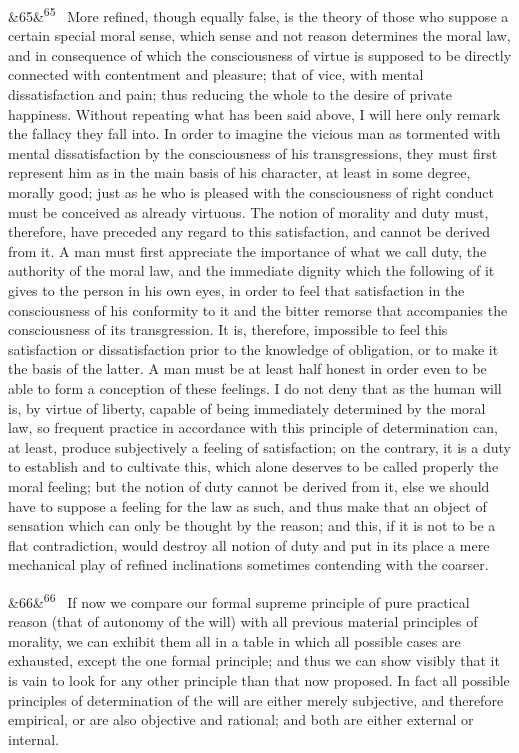 \documentclass[12pt]{article}
\newcommand{\para}[1][]{\par\noindent\ifx&#1&\else\textsuperscript{\footnotesize #1}~\fi}
\begin{document}
\para[65] More refined, though equally false, is the theory of those who suppose a certain special moral sense, which sense and not reason determines the moral law, and in consequence of which the consciousness of virtue is supposed to be directly connected with contentment and pleasure; that of vice, with mental dissatisfaction and pain; thus reducing the whole to the desire of private happiness. Without repeating what has been said above, I will here only remark the fallacy they fall into. In order to imagine the vicious man as tormented with mental dissatisfaction by the consciousness of his transgressions, they must first represent him as in the main basis of his character, at least in some degree, morally good; just as he who is pleased with the consciousness of right conduct must be conceived as already virtuous. The notion of morality and duty must, therefore, have preceded any regard to this satisfaction, and cannot be derived from it. A man must first appreciate the importance of what we call duty, the authority of the moral law, and the immediate dignity which the following of it gives to the person in his own eyes, in order to feel that satisfaction in the consciousness of his conformity to it and the bitter remorse that accompanies the consciousness of its transgression. It is, therefore, impossible to feel this satisfaction or dissatisfaction prior to the knowledge of obligation, or to make it the basis of the latter. A man must be at least half honest in order even to be able to form a conception of these feelings. I do not deny that as the human will is, by virtue of liberty, capable of being immediately determined by the moral law, so frequent practice in accordance with this principle of determination can, at least, produce subjectively a feeling of satisfaction; on the contrary, it is a duty to establish and to cultivate this, which alone deserves to be called properly the moral feeling; but the notion of duty cannot be derived from it, else we should have to suppose a feeling for the law as such, and thus make that an object of sensation which can only be thought by the reason; and this, if it is not to be a flat contradiction, would destroy all notion of duty and put in its place a mere mechanical play of refined inclinations sometimes contending with the coarser.

\para[66] If now we compare our formal supreme principle of pure practical reason (that of autonomy of the will) with all previous material principles of morality, we can exhibit them all in a table in which all possible cases are exhausted, except the one formal principle; and thus we can show visibly that it is vain to look for any other principle than that now proposed. In fact all possible principles of determination of the will are either merely subjective, and therefore empirical, or are also objective and rational; and both are either external or internal.
\end{document}
